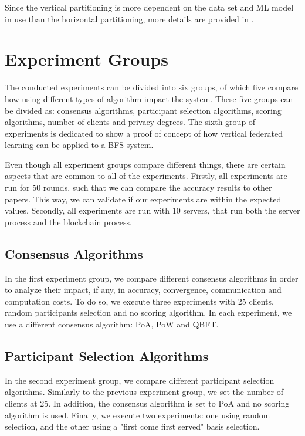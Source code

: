 Since the vertical partitioning is more dependent on the data set and ML model in use than the horizontal partitioning, more details are provided in .

\section{Experiment Groups}\label{meth:experiments}

The conducted experiments can be divided into six groups, of which five compare how using different types of algorithm impact the system. These five groups can be divided as: consensus algorithms, participant selection algorithms, scoring algorithms, number of clients and privacy degrees. The sixth group of experiments is dedicated to show a proof of concept of how vertical federated learning can be applied to a BFS system.

Even though all experiment groups compare different things, there are certain aspects that are common to all of the experiments. Firstly, all experiments are run for 50 rounds, such that we can compare the accuracy results to other papers. This way, we can validate if our experiments are within the expected values. Secondly, all experiments are run with 10 servers, that run both the server process and the blockchain process. 

\subsection{Consensus Algorithms}

In the first experiment group, we compare different consensus algorithms in order to analyze their impact, if any, in accuracy, convergence, communication and computation costs. To do so, we execute three experiments with 25 clients, random participants selection and no scoring algorithm. In each experiment, we use a different consensus algorithm: PoA, PoW and QBFT.

\subsection{Participant Selection Algorithms}

In the second experiment group, we compare different participant selection algorithms. Similarly to the previous experiment group, we set the number of clients at 25. In addition, the consensus algorithm is set to PoA and no scoring algorithm is used. Finally, we execute two experiments: one using random selection, and the other using a "first come first served" basis selection.

